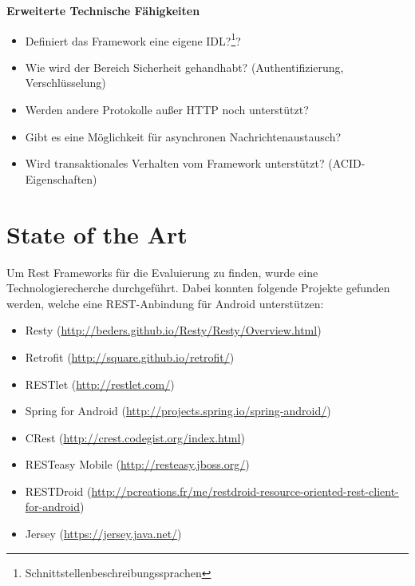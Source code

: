 \documentclass[a4paper,11pt,german,public]{INSOexpose}
\begin{document}
\textbf{Erweiterte Technische Fähigkeiten}
\begin{itemize}[label=$-$]
	\item Definiert das Framework eine eigene IDL?\footnote{Schnittstellenbeschreibungssprachen}?
	\item Wie wird der Bereich Sicherheit gehandhabt?  (Authentifizierung, Verschlüsselung)
	\item Werden andere Protokolle außer HTTP noch unterstützt?
	\item Gibt es eine Möglichkeit für asynchronen Nachrichtenaustausch?
	\item Wird transaktionales Verhalten vom Framework unterstützt? (ACID-Eigenschaften)
\end{itemize}

\section{State of the Art}
Um Rest Frameworks für die Evaluierung zu finden, wurde eine Technologierecherche durchgeführt. Dabei konnten folgende Projekte gefunden werden, welche eine REST-Anbindung für Android unterstützen:
\begin{itemize}
	\item Resty (\href{http://beders.github.io/Resty/Resty/Overview.html}{http://beders.github.io/Resty/Resty/Overview.html})
	\item Retrofit (\href{http://square.github.io/retrofit/}{http://square.github.io/retrofit/})
	\item RESTlet (\href{http://restlet.com/}{http://restlet.com/})
	\item Spring for Android (\href{http://projects.spring.io/spring-android/}{http://projects.spring.io/spring-android/})
	\item CRest (\href{http://crest.codegist.org/index.html}{http://crest.codegist.org/index.html})
	\item RESTeasy Mobile (\href{http://resteasy.jboss.org/}{http://resteasy.jboss.org/})
	\item RESTDroid (\href{http://pcreations.fr/me/restdroid-resource-oriented-rest-client-for-android}{http://pcreations.fr/me/restdroid-resource-oriented-rest-client-for-android})
	\item Jersey (\href{https://jersey.java.net/}{https://jersey.java.net/})
\end{itemize}
\end{document}
